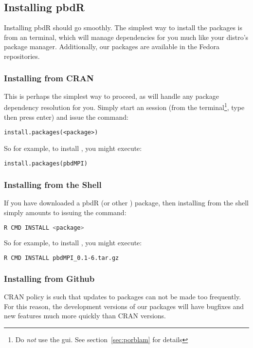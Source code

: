 \subsection{Installing pbdR}
Installing pbdR should go smoothly.  The simplest way to install the packages is from an  terminal, which will manage dependencies for you much like your distro's package manager.  Additionally, our packages are available in the Fedora repositories.


\subsubsection{Installing from CRAN}
This is perhaps the simplest way to proceed, as  will handle any package dependency resolution for you.  Simply start an  session (from the terminal\footnote{Do \emph{not} use the gui.  See section~\ref{sec:porblam} for details}, type  then press enter) and issue the command:
\begin{lstlisting}[language=rr]
install.packages(<package>)
\end{lstlisting}
So for example, to install , you might execute:
\begin{lstlisting}[language=rr]
install.packages(pbdMPI)
\end{lstlisting}


\subsubsection{Installing from the Shell}
If you have downloaded a pbdR (or other ) package, then installing from the shell simply amounts to issuing the command:
\begin{lstlisting}[language=sh]
R CMD INSTALL <package>
\end{lstlisting}
So for example, to install , you might execute:
\begin{lstlisting}[language=sh]
R CMD INSTALL pbdMPI_0.1-6.tar.gz
\end{lstlisting}


\subsubsection{Installing from Github}
CRAN policy is such that updates to packages can not be made too frequently.  For this reason, the development versions of our packages will have bugfixes and new features much more quickly than CRAN versions.  
